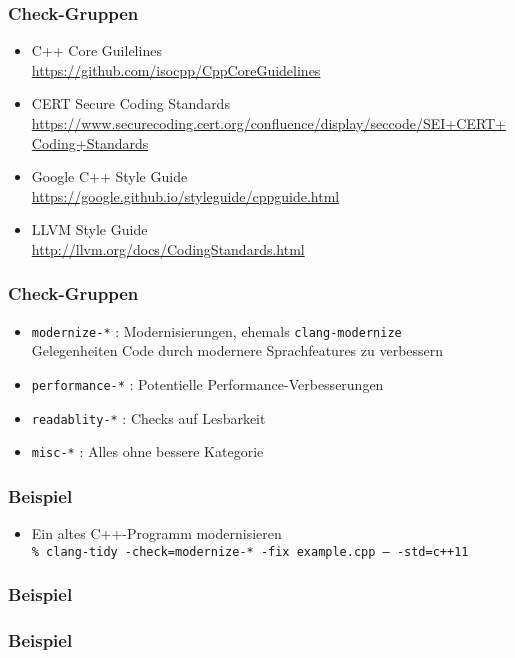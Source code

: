 \documentclass[aspectratio=169]{beamer}
\begin{document}
\begin{frame}
  \frametitle{Check-Gruppen}
  \begin{itemize}
  \item C++ Core Guilelines\\
    \qquad \url{https://github.com/isocpp/CppCoreGuidelines}
  \item CERT Secure Coding Standards\\
    \qquad \url{https://www.securecoding.cert.org/confluence/display/seccode/SEI+CERT+Coding+Standards}
  \item Google C++ Style Guide\\
    \qquad \url{https://google.github.io/styleguide/cppguide.html}
  \item LLVM Style Guide\\
    \qquad \url{http://llvm.org/docs/CodingStandards.html}
  \end{itemize}
\end{frame}
\begin{frame}
  \frametitle{Check-Gruppen}
  \begin{itemize}
  \item \texttt{modernize-*} : Modernisierungen, ehemals \texttt{clang-modernize}\\
    Gelegenheiten Code durch modernere Sprachfeatures zu verbessern
  \item \texttt{performance-*} : Potentielle Performance-Verbesserungen
  \item \texttt{readablity-*} : Checks auf Lesbarkeit
  \item \texttt{misc-*} : Alles ohne bessere Kategorie
  \end{itemize}
\end{frame}
\begin{frame}[fragile]
  \frametitle{Beispiel}
  \begin{itemize}
  \item Ein altes C++-Programm modernisieren\\
    \texttt{\% clang-tidy -check=modernize-* -fix example.cpp -- -std=c++11}
  \end{itemize}
\end{frame}
\begin{frame}[fragile]
  \frametitle{Beispiel}

\end{frame}
\begin{frame}[fragile]
  \frametitle{Beispiel}
  
\end{frame}
\end{document}
